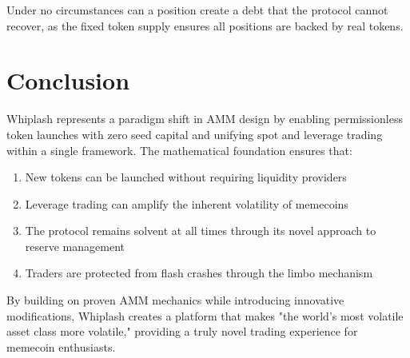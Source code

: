 \documentclass[11pt]{article}
\begin{document}
Under no circumstances can a position create a debt that the protocol cannot recover, as the fixed token supply ensures all positions are backed by real tokens.

\section{Conclusion}

Whiplash represents a paradigm shift in AMM design by enabling permissionless token launches with zero seed capital and unifying spot and leverage trading within a single framework. The mathematical foundation ensures that:

\begin{enumerate}
    \item New tokens can be launched without requiring liquidity providers
    \item Leverage trading can amplify the inherent volatility of memecoins
    \item The protocol remains solvent at all times through its novel approach to reserve management
    \item Traders are protected from flash crashes through the limbo mechanism
\end{enumerate}

By building on proven AMM mechanics while introducing innovative modifications, Whiplash creates a platform that makes "the world's most volatile asset class more volatile," providing a truly novel trading experience for memecoin enthusiasts.
\end{document}
